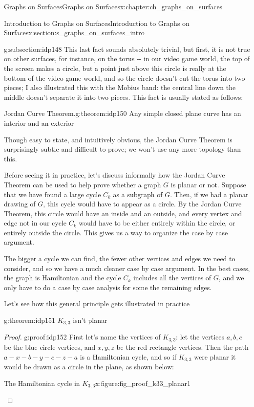 \documentclass[oneside,10pt,]{book}
\numberwithin{equation}{section}
\begin{document}
\begin{chapterptx}{Graphs on Surfaces}{}{Graphs on Surfaces}{}{}{x:chapter:ch_graphs_on_surfaces}
\begin{sectionptx}{Introduction to Graphs on Surfaces}{}{Introduction to Graphs on Surfaces}{}{}{x:section:s_graphs_on_surfaces_intro}
\begin{subsectionptx}{}{}{}{}{}{g:subsection:idp148}
This last fact sounds absolutely trivial, but first, it is not true on other surfaces, for instance, on the torus -{}-{} in our video game world, the top of the screen makes a circle, but a point just above this circle is really at the bottom of the video game world, and so the circle doesn't cut the torus into two pieces; I also illustrated this with the Mobius band: the central line down the middle doesn't separate it into two pieces.  This fact is usually stated as follows:%
\begin{theorem}{Jordan Curve Theorem.}{}{g:theorem:idp150}%
Any simple closed plane curve has an interior and an exterior%
\end{theorem}
Though easy to state, and intuitively obvious, the Jordan Curve Theorem is surprisingly subtle and difficult to prove; we won't use any more topology than this.%
\par
Before seeing it in practice, let's discuss informally how the Jordan Curve Theorem can be used to help prove whether a graph \(G\) is planar or not.  Suppose that we have found a large cycle \(C_k\) as a subgraph of \(G\).  Then, if we had a planar drawing of \(G\), this cycle would have to appear as a circle.  By the Jordan Curve Theorem, this circle would have an inside and an outside, and every vertex and edge not in our cycle \(C_k\) would have to be either entirely within the circle, or entirely outside the circle.  This gives us a way to organize the case by case argument.%
\par
The bigger a cycle we can find, the fewer other vertices and edges we need to consider, and so we have a much cleaner case by case argument.  In the best cases, the graph is Hamiltonian and the cycle \(C_k\) includes all the vertices of \(G\), and we only have to do a case by case analysis for some the remaining edges.%
\par
Let's see how this general principle gets illustrated in practice%
\begin{theorem}{}{}{g:theorem:idp151}%
\(K_{3,3}\) isn't planar\end{theorem}
\begin{proof}{}{g:proof:idp152}
First let's name the vertices of \(K_{3,3}\): let the vertices \(a,b,c\) be the blue circle vertices, and \(x,y,z\) be the red rectangle vertices.  Then the path \(a-x-b-y-c-z-a\) is a Hamiltonian cycle, and so if \(K_{3,3}\) were planar it would be drawn as a circle in the plane, as shown below:%
\begin{figureptx}{The Hamiltonian cycle in \(K_{3,3}\)}{x:figure:fig_proof_k33_planar1}{}%

\end{figureptx}
\end{proof}
\end{subsectionptx}
\end{sectionptx}
\end{chapterptx}
\end{document}
